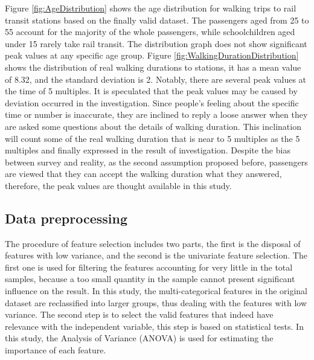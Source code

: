 \documentclass[Journal,letterpaper]{ascelike-new}
\begin{document}
%
Figure \ref{fig:AgeDistribution} shows the age distribution for walking trips to rail transit stations based on the finally valid dataset. The passengers aged from 25 to 55 account for the majority of the whole passengers, while schoolchildren aged under 15 rarely take rail transit. The distribution graph does not show significant peak values at any specific age group. Figure \ref{fig:WalkingDurationDistribution} shows the distribution of real walking durations to stations, it has a mean value of 8.32, and the standard deviation is 2. Notably, there are several peak values at the time of 5 multiples. It is speculated that the peak values may be caused by deviation occurred in the investigation. Since people's feeling about the specific time or number is inaccurate, they are inclined to reply a loose answer when they are asked some questions about the details of walking duration. This inclination will count some of the real walking duration that is near to 5 multiples as the 5 multiples and finally expressed in the result of investigation. Despite the bias between survey and reality, as the second assumption proposed before, passengers are viewed that they can accept the walking duration what they answered, therefore, the peak values are thought available in this study.

\subsection{Data preprocessing}
The procedure of feature selection includes two parts, the first is the disposal of features with low variance, and the second is the univariate feature selection. The first one is used for filtering the features accounting for very little in the total samples, because a too small quantity in the sample cannot present significant influence on the result. In this study, the multi-categorical features in the original dataset are reclassified into larger groups, thus dealing with the features with low variance. The second step is to select the valid features that indeed have relevance with the independent variable, this step is based on statistical tests. In this study, the Analysis of Variance (ANOVA) is used for estimating the importance of each feature.
\end{document}
